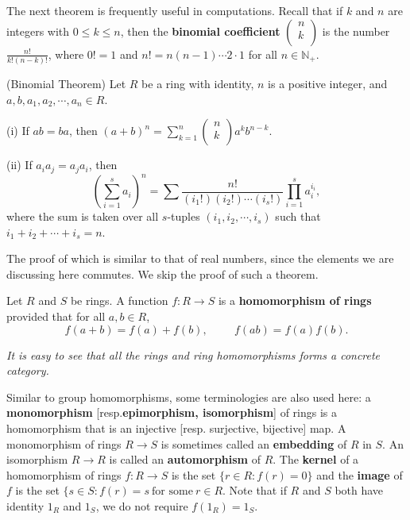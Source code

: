 The next theorem is frequently useful in computations. Recall that if $k$ and $n$ are integers with $0\le k\le n$, then the \textbf{binomial coefficient} $\left( \begin{array}{c}
	n\\
	k\\
\end{array} \right) $ is the number $\frac{n!}{k!(n-k)!}$, where $0!=1$ and $n!=n(n-1)\cdots 2\cdot1$ for all $n\in\mathbb{N}_+$.
\begin{theorem}(Binomial Theorem)
Let $R$ be a ring with identity, $n$ is a positive integer, and $a,b,a_1,a_2,\cdots,a_n\in R$.\par
(i) If $ab=ba$, then $
\left( a+b \right) ^n=\sum_{k=1}^n{\left( \begin{array}{c}
	n\\
	k\\
\end{array} \right) a^kb^{n-k}}.
$\par
(ii) If $a_ia_j=a_ja_i$, then 
$$
\left( \sum_{i=1}^s{a_i} \right) ^n=\sum{\frac{n!}{\left( i_1! \right) \left( i_2! \right) \cdots \left( i_s! \right)}\prod_{i=1}^s{a_{i}^{i_i}}},
$$
where the sum is taken over all $s$-tuples $(i_1,i_2,\cdots,i_s)$ such that $i_1+i_2+\cdots+i_s=n$.
\end{theorem}
The proof of which is similar to that of real numbers, since the elements we are discussing here commutes. We skip the proof of such a theorem.
\begin{definition}
Let $R$ and $S$ be rings. A function $f:R\to S$ is a \textbf{homomorphism of rings} provided that for all $a,b\in R$,
$$f(a+b)=f(a)+f(b),\hspace{1cm}f(ab)=f(a)f(b).$$
\end{definition}
\begin{note}\em
It is easy to see that all the rings and ring homomorphisms forms a concrete category.
\end{note}
Similar to group homomorphisms, some terminologies are also used here: a \textbf{monomorphism} [resp.\textbf{epimorphism, isomorphism}] of rings is a homomorphism that is an injective [resp. surjective, bijective] map. A monomorphism of rings $R\to S$ is sometimes called an \textbf{embedding} of $R$ in $S$. An isomorphism $R\to R$ is called an \textbf{automorphism} of $R$. The \textbf{kernel} of a homomorphism of rings $f:R\to S$ is the set $\{r\in R:f(r)=0\}$ and the \textbf{image} of $f$ is the set $\{s\in S:f(r)=s\ \text{for some}\ r\in R$. Note that if $R$ and $S$ both have identity $1_R$ and $1_S$, we do not require $f(1_R)=1_S$.
